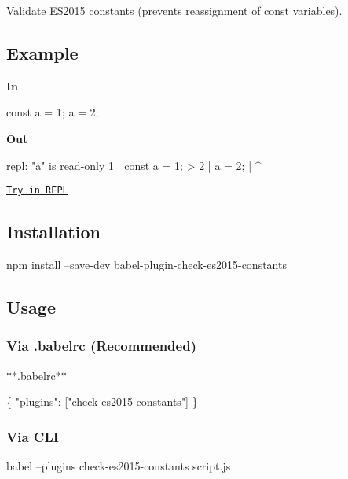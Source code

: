 Validate E\+S2015 constants (prevents reassignment of const variables).

\subsection*{Example}

{\bfseries In}


\begin{DoxyCode}
const a = 1;
a = 2;
\end{DoxyCode}


{\bfseries Out}


\begin{DoxyCode}
repl: "a" is read-only
  1 | const a = 1;
> 2 | a = 2;
    | ^
\end{DoxyCode}


\href{http://babeljs.io/repl/#?babili=false&evaluate=true&lineWrap=false&presets=es2015&experimental=false&loose=false&spec=false&code=const%20a%20%3D%201%3B%0Aa%20%3D%202%3B&playground=true}{\tt Try in R\+E\+PL}

\subsection*{Installation}


\begin{DoxyCode}
npm install --save-dev babel-plugin-check-es2015-constants
\end{DoxyCode}


\subsection*{Usage}

\subsubsection*{Via {\ttfamily .babelrc} (Recommended)}

$\ast$$\ast$.babelrc$\ast$$\ast$


\begin{DoxyCode}
\{
  "plugins": ["check-es2015-constants"]
\}
\end{DoxyCode}


\subsubsection*{Via C\+LI}


\begin{DoxyCode}
babel --plugins check-es2015-constants script.js
\end{DoxyCode}


